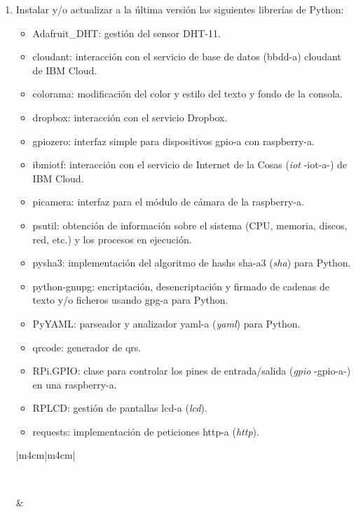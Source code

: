 \documentclass[12pt,a4paper, twoside]{report}
\begin{document}
\begin{enumerate}
		\item Instalar y/o actualizar a la última versión las siguientes librerías de Python: 		
		\begin{itemize}
			\item Adafruit\_DHT: gestión del sensor DHT-11.
			\item cloudant: interacción con el servicio de base de datos (\gls{bbdd-a}) \gls{cloudant} de IBM Cloud.
			\item colorama: modificación del color y estilo del texto y fondo de la consola.
			\item dropbox: interacción con el servicio Dropbox.
			\item gpiozero: interfaz simple para dispositivos \gls{gpio-a} con \gls{raspberry-a}.
			\item ibmiotf: interacción con el servicio de Internet de la Cosas (\textit{\gls{iot}} -\gls{iot-a}-) de IBM Cloud.
			\item picamera: interfaz para el módulo de cámara de la \gls{raspberry-a}.
			\item psutil: obtención de información sobre el sistema (CPU, memoria, discos, red, etc.) y los procesos en ejecución.
			\item pysha3: implementación del algoritmo de \glspl{hash} \gls{sha-a}3 (\textit{\gls{sha}}) para Python.
			\item python-gnupg: encriptación, desencriptación y firmado de cadenas de texto y/o ficheros usando \gls{gpg-a} para Python.
			\item PyYAML: parseador y analizador \gls{yaml-a} (\textit{\gls{yaml}}) para Python.
			\item qrcode: generador de \glspl{qr}.
			\item RPi.GPIO: clase para controlar los pines de entrada/salida (\textit{\gls{gpio}} -\gls{gpio-a}-) en una \gls{raspberry-a}.
			\item RPLCD: gestión de pantallas \gls{lcd-a} (\textit{\gls{lcd}}). 
			\item requests: implementación de peticiones \gls{http-a} (\textit{\gls{http}}). 
		\end{itemize}
		
		\begin{longtable}{|m{4cm}|m{4cm}|}
			\hline
			
			 \\ \hline
		
			 &  \\ \hline
				

\end{longtable}
\end{enumerate}
\end{document}
